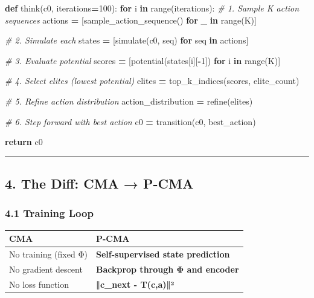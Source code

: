 \documentclass[
  11pt,
  a4paper,
]{article}
\newenvironment{Shaded}{\begin{snugshade}}{\end{snugshade}}
\newcommand{\BuiltInTok}[1]{#1}
\newcommand{\CommentTok}[1]{\textcolor[rgb]{0.56,0.35,0.01}{\textit{#1}}}
\newcommand{\ControlFlowTok}[1]{\textcolor[rgb]{0.13,0.29,0.53}{\textbf{#1}}}
\newcommand{\DecValTok}[1]{\textcolor[rgb]{0.00,0.00,0.81}{#1}}
\newcommand{\KeywordTok}[1]{\textcolor[rgb]{0.13,0.29,0.53}{\textbf{#1}}}
\newcommand{\NormalTok}[1]{#1}
\newcommand{\OperatorTok}[1]{\textcolor[rgb]{0.81,0.36,0.00}{\textbf{#1}}}
\begin{document}
\begin{Shaded}
\begin{Highlighting}[]
\KeywordTok{def}\NormalTok{ think(c0, iterations}\OperatorTok{=}\DecValTok{100}\NormalTok{):}
    \ControlFlowTok{for}\NormalTok{ i }\KeywordTok{in} \BuiltInTok{range}\NormalTok{(iterations):}
        \CommentTok{\# 1. Sample K action sequences}
\NormalTok{        actions }\OperatorTok{=}\NormalTok{ [sample\_action\_sequence() }\ControlFlowTok{for}\NormalTok{ \_ }\KeywordTok{in} \BuiltInTok{range}\NormalTok{(K)]}
        
        \CommentTok{\# 2. Simulate each}
\NormalTok{        states }\OperatorTok{=}\NormalTok{ [simulate(c0, seq) }\ControlFlowTok{for}\NormalTok{ seq }\KeywordTok{in}\NormalTok{ actions]}
        
        \CommentTok{\# 3. Evaluate potential}
\NormalTok{        scores }\OperatorTok{=}\NormalTok{ [potential(states[i][}\OperatorTok{{-}}\DecValTok{1}\NormalTok{]) }\ControlFlowTok{for}\NormalTok{ i }\KeywordTok{in} \BuiltInTok{range}\NormalTok{(K)]}
        
        \CommentTok{\# 4. Select elites (lowest potential)}
\NormalTok{        elites }\OperatorTok{=}\NormalTok{ top\_k\_indices(scores, elite\_count)}
        
        \CommentTok{\# 5. Refine action distribution}
\NormalTok{        action\_distribution }\OperatorTok{=}\NormalTok{ refine(elites)}
        
        \CommentTok{\# 6. Step forward with best action}
\NormalTok{        c0 }\OperatorTok{=}\NormalTok{ transition(c0, best\_action)}
    
    \ControlFlowTok{return}\NormalTok{ c0}
\end{Highlighting}
\end{Shaded}

\begin{center}\rule{0.5\linewidth}{0.5pt}\end{center}

\subsection{4. The Diff: CMA → P-CMA}\label{the-diff-cma-p-cma}

\subsubsection{4.1 Training Loop}\label{training-loop}

\begin{longtable}[]{@{}ll@{}}
\toprule\noalign{}
CMA & \textbf{P-CMA} \\
\midrule\noalign{}
\endhead
\bottomrule\noalign{}
\endlastfoot
No training (fixed Φ) & \textbf{Self-supervised state prediction} \\
No gradient descent & \textbf{Backprop through Φ and encoder} \\
No loss function & \textbf{‖c\_next - T(c,a)‖²} \\
\end{longtable}
\end{document}
